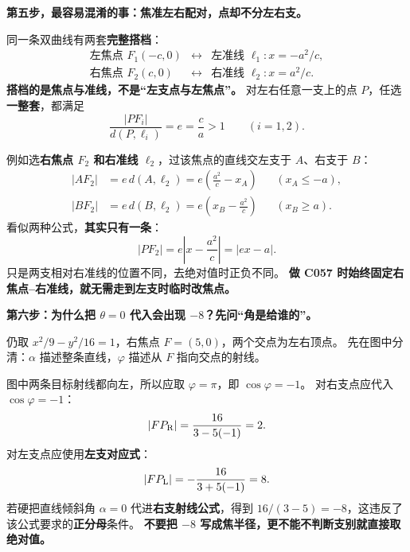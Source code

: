 \clearpage
\begin{explanationbox}
  \textbf{第五步，最容易混淆的事：焦准左右配对，点却不分左右支。}

  同一条双曲线有两套\textbf{完整搭档}：
  \[
    \begin{array}{lll}
      \text{左焦点 }F_1(-c,0)&\longleftrightarrow&\text{左准线 }\ell_1:x=-a^2/c,\\[3pt]
      \text{右焦点 }F_2(c,0)&\longleftrightarrow&\text{右准线 }\ell_2:x=a^2/c.
    \end{array}
  \]
  \textbf{搭档的是焦点与准线，不是“左支点与左焦点”。}
  对左右任意一支上的点 $P$，任选\textbf{一整套}，都满足
  \[
    \frac{|PF_i|}{d(P,\ell_i)}=e=\frac ca>1\qquad(i=1,2).
  \]

  例如选\textbf{右焦点 $F_2$ 和右准线 $\ell_2$}，过该焦点的直线交左支于 $A$、右支于 $B$：
  \[
    \begin{aligned}
      |AF_2|&=e\,d(A,\ell_2)=e\left(\frac{a^2}{c}-x_A\right)
          &&(x_A\le -a),\\[3pt]
      |BF_2|&=e\,d(B,\ell_2)=e\left(x_B-\frac{a^2}{c}\right)
          &&(x_B\ge a).
    \end{aligned}
  \]
  看似两种公式，\textbf{其实只有一条}：
  \[
     \boxed{|PF_2|=e\left|x-\frac{a^2}{c}\right|=|ex-a|}.
  \]
  只是两支相对右准线的位置不同，去绝对值时正负不同。
  \textbf{做 C057 时始终固定右焦点--右准线，就无需走到左支时临时改焦点。}
\end{explanationbox}


\clearpage
\begin{explanationbox}
  \textbf{第六步：为什么把 $\theta=0$ 代入会出现 $-8$？先问“角是给谁的”。}

  仍取 $x^2/9-y^2/16=1$，右焦点 $F=(5,0)$，两个交点为左右顶点。
  先在图中分清：$\alpha$ 描述整条直线，$\varphi$ 描述从 $F$ 指向交点的射线。
  \begin{center}\end{center}
  图中两条目标射线都向左，所以应取 $\varphi=\pi$，即 $\cos\varphi=-1$。
  对右支点应代入 $\cos\varphi=-1$：
  \[
    |FP_{\rm R}|=\frac{16}{3-5(-1)}=2.
  \]
  对左支点应使用\textbf{左支对应式}：
  \[
    |FP_{\rm L}|=-\frac{16}{3+5(-1)}=8.
  \]
  若硬把直线倾斜角 $\alpha=0$ 代进\textbf{右支射线公式}，得到
  $16/(3-5)=-8$，这违反了该公式要求的\textbf{正分母}条件。
  \textbf{不要把 $-8$ 写成焦半径，更不能不判断支别就直接取绝对值。}
\end{explanationbox}

